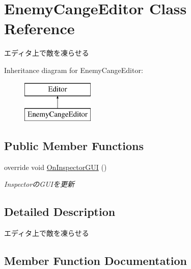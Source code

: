 \hypertarget{class_enemy_cange_editor}{}\section{Enemy\+Cange\+Editor Class Reference}
\label{class_enemy_cange_editor}


エディタ上で敵を凍らせる  


Inheritance diagram for Enemy\+Cange\+Editor\+:\begin{figure}[H]
\begin{center}
\leavevmode
\includegraphics[height=2.000000cm]{class_enemy_cange_editor}
\end{center}
\end{figure}
\subsection*{Public Member Functions}
\begin{DoxyCompactItemize}
\item 
override void \hyperlink{class_enemy_cange_editor_ae6e304e83fa055a1a3d3ca89f972a5dd}{On\+Inspector\+G\+UI} ()
\begin{DoxyCompactList}\small\item\em Inspectorの\+G\+U\+Iを更新 \end{DoxyCompactList}\end{DoxyCompactItemize}


\subsection{Detailed Description}
エディタ上で敵を凍らせる 



\subsection{Member Function Documentation}
\mbox{\label{class_enemy_cange_editor_ae6e304e83fa055a1a3d3ca89f972a5dd}} 
